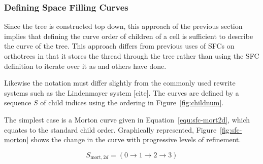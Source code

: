 \documentclass[twoside]{IIBproject}
\numberwithin{figure}{section}
\begin{document}

        \subsubsection{Defining Space Filling Curves} %
            \label{sec:tftt-sfc}

            Since the tree is constructed top down, this approach of the previous section implies that defining the curve order of children of a cell is sufficient to describe the curve of the tree. This approach differs from previous uses of SFCs on orthotrees in that it stores the thread through the tree rather than using the SFC definition to iterate over it as \cite{bader2013} and others have done.

            Likewise the notation must differ slightly from the commonly used rewrite systems such as the Lindenmayer system [cite]. The curves are defined by a sequence $S$ of child indices using the ordering in Figure~\ref{fig:childnum}.

            The simplest case is a Morton curve given in Equation~\ref{equ:sfc-mort2d}, which equates to the standard child order. Graphically represented, Figure~\ref{fig:sfc-morton} shows the change in the curve with progressive levels of refinement. 

            \begin{equation}
                \label{equ:sfc-mort2d}
                S_{\mathrm{mort},2d} = \left( 0 \to 1 \to 2 \to 3 \right)
            \end{equation}
\end{document}
